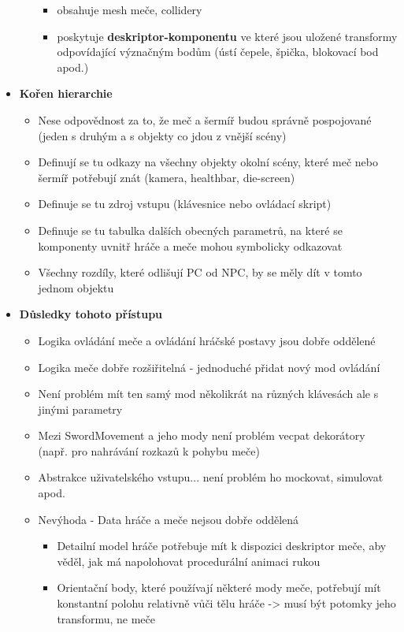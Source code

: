 \begin{itemize}
\begin{itemize}
\begin{itemize}
                    \item obsahuje mesh meče, collidery
                    \item poskytuje \textbf{deskriptor-komponentu} ve které jsou uložené transformy odpovídající význačným bodům (ústí čepele, špička, blokovací bod apod.)
                \end{itemize}
        \end{itemize} 
    \item \textbf{Kořen hierarchie} 
        \begin{itemize}
            \item Nese odpovědnost za to, že meč a šermíř budou správně pospojované (jeden s druhým a s objekty co jdou z vnější scény)
            \item Definují se tu odkazy na všechny objekty okolní scény, které meč nebo šermíř potřebují znát (kamera, healthbar, die-screen)
            \item Definuje se tu zdroj vstupu (klávesnice nebo ovládací skript)
            \item Definuje se tu tabulka dalších obecných parametrů, na které se komponenty uvnitř hráče a meče mohou symbolicky odkazovat
            \item Všechny rozdíly, které odlišují \acs{PC} od \acs{NPC}, by se měly dít v tomto jednom objektu
        \end{itemize} 
    \item \textbf{Důsledky tohoto přístupu} 
        \begin{itemize}
            \item Logika ovládání meče a ovládání hráčské postavy jsou dobře oddělené
            \item Logika meče dobře rozšiřitelná - jednoduché přidat nový mod ovládání
            \item Není problém mít ten samý mod několikrát na různých klávesách ale s jinými parametry
            \item Mezi SwordMovement a jeho mody není problém vecpat dekorátory (např. pro nahrávání rozkazů k pohybu meče)
            \item Abstrakce uživatelského vstupu... není problém ho mockovat, simulovat apod.
            \item Nevýhoda - Data hráče a meče nejsou dobře oddělená
                \begin{itemize}
                    \item Detailní model hráče potřebuje mít k dispozici deskriptor meče, aby věděl, jak má napolohovat procedurální animaci rukou
                    \item Orientační body, které používají některé mody meče, potřebují mít konstantní polohu relativně vůči tělu hráče -> musí být potomky jeho transformu, ne meče
                \end{itemize}
        \end{itemize} 
\end{itemize}

